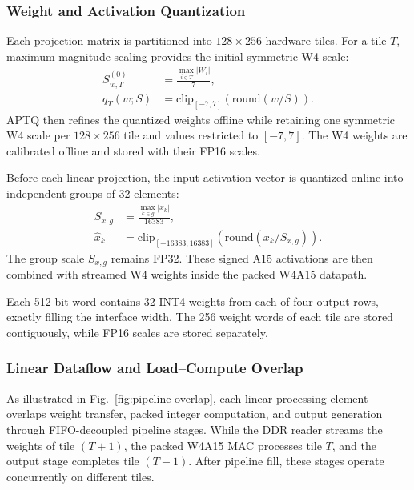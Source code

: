 \documentclass[conference]{IEEEtran}
\begin{document}
\subsubsection{Weight and Activation Quantization}

Each projection matrix is partitioned into $128\times256$ hardware tiles. For a tile
$T$, maximum-magnitude scaling provides the initial symmetric W4 scale:
\begin{equation}
\begin{aligned}
 S^{(0)}_{w,T}&=\frac{\max_{i\in T}|W_i|}{7},\\
 q_T(w;S)&=\mathrm{clip}_{[-7,7]}
 \left(\mathrm{round}(w/S)\right).
\end{aligned}
 \label{eq:tilequant}
\end{equation}
APTQ then refines the quantized weights offline while retaining one symmetric W4
scale per $128\times256$ tile and values restricted to $[-7,7]$. The W4 weights
are calibrated offline and stored with their FP16 scales.

Before each linear projection, the input activation vector is quantized online
into independent groups of 32 elements:
\begin{equation}
\begin{aligned}
 S_{x,g}&=\frac{\max_{k\in g}|x_k|}{16383},\\
 \hat x_k&=\mathrm{clip}_{[-16383,16383]}
 \left(\mathrm{round}\left(x_k/S_{x,g}\right)\right).
\end{aligned}
 \label{eq:aquant}
\end{equation}
The group scale $S_{x,g}$ remains FP32. These signed A15 activations are then
combined with streamed W4 weights inside the packed W4A15 datapath.

Each 512-bit word contains 32 INT4 weights from each of four output rows,
exactly filling the interface width. The 256 weight words of each tile are
stored contiguously, while FP16 scales are stored separately.

\subsubsection{Linear Dataflow and Load--Compute Overlap}

As illustrated in Fig.~\ref{fig:pipeline-overlap}, each linear processing
element overlaps weight transfer, packed integer computation, and output
generation through FIFO-decoupled pipeline stages. While the DDR reader streams
the weights of tile $(T+1)$, the packed W4A15 MAC processes tile $T$, and the
output stage completes tile $(T-1)$. After pipeline fill, these stages operate
concurrently on different tiles.
\end{document}
